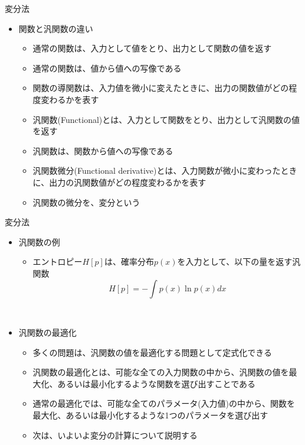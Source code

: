 \documentclass[dvipdfmx,notheorems,t]{beamer}
\begin{document}
\begin{frame}{変分法}

\begin{itemize}
	\item 関数と\alert{汎関数}の違い
	\begin{itemize}
		\item 通常の関数は、入力として値をとり、出力として関数の値を返す
		\item 通常の関数は、\alert{値から値への写像}である
		\newline
		\item 関数の導関数は、入力値を微小に変えたときに、出力の関数値がどの程度変わるかを表す
		\newline
		\item \alert{汎関数}(Functional)とは、入力として\alert{関数をとり}、出力として汎関数の\alert{値}を返す
		\item 汎関数は、\alert{関数から値への写像}である
		\newline
		\item \alert{汎関数微分}(Functional derivative)とは、\alert{入力関数が微小に変わったとき}に、出力の汎関数値がどの程度変わるかを表す
		\newline
		\item 汎関数の微分を、\alert{変分}という
	\end{itemize}
\end{itemize}

\end{frame}

\begin{frame}{変分法}

\begin{itemize}
	\item 汎関数の例
	\begin{itemize}
		\item エントロピー$H[p]$は、確率分布$p(x)$を入力として、以下の量を返す汎関数
		\begin{equation}
			H[p] = -\int p(x) \ln p(x) dx
		\end{equation}
	\end{itemize} \
	
	\item 汎関数の最適化
	\begin{itemize}
		\item 多くの問題は、\alert{汎関数の値を最適化する問題}として定式化できる
		\newline
		\item 汎関数の最適化とは、\alert{可能な全ての入力関数の中から}、汎関数の値を最大化、あるいは最小化するような\alert{関数を選び出す}ことである
		\newline
		\item 通常の最適化では、可能な全てのパラメータ(入力値)の中から、関数を最大化、あるいは最小化するような1つのパラメータを選び出す
		\newline
		\item 次は、いよいよ\alert{変分}の計算について説明する
	\end{itemize}
\end{itemize}

\end{frame}
\end{document}
